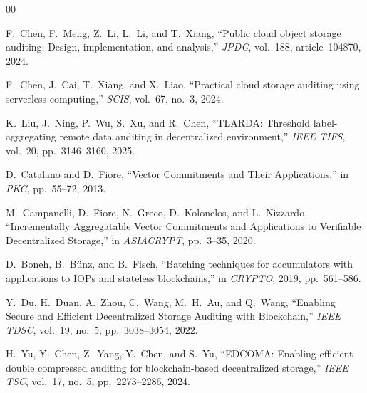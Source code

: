 \documentclass[lettersize,journal]{IEEEtran}
\begin{document}
\begin{thebibliography}{00}

F.~Chen, F.~Meng, Z.~Li, L.~Li, and T.~Xiang,
``Public cloud object storage auditing: Design, implementation, and analysis,''
\emph{JPDC}, vol.~188, article~104870, 2024.

F.~Chen, J.~Cai, T.~Xiang, and X.~Liao,
``Practical cloud storage auditing using serverless computing,''
\emph{SCIS}, vol.~67, no.~3, 2024.

K.~Liu, J.~Ning, P.~Wu, S.~Xu, and R.~Chen,
``TLARDA: Threshold label-aggregating remote data auditing in decentralized environment,''
\emph{IEEE TIFS}, vol.~20, pp.~3146--3160, 2025.

D.~Catalano and D.~Fiore,
``Vector Commitments and Their Applications,''
in \emph{PKC}, pp.~55--72, 2013.

M.~Campanelli, D.~Fiore, N.~Greco, D.~Kolonelos, and L.~Nizzardo,
``Incrementally Aggregatable Vector Commitments and Applications to Verifiable Decentralized Storage,''
in \emph{ASIACRYPT}, pp.~3--35, 2020.

D.~Boneh, B.~B{\"u}nz, and B.~Fisch,
``Batching techniques for accumulators with applications to IOPs and stateless blockchains,''
in \emph{CRYPTO}, 2019, pp.~561--586.

Y.~Du, H.~Duan, A.~Zhou, C.~Wang, M.~H.~Au, and Q.~Wang,
``Enabling Secure and Efficient Decentralized Storage Auditing with Blockchain,''
\emph{IEEE TDSC}, vol.~19, no.~5, pp.~3038--3054, 2022.


H.~Yu, Y.~Chen, Z.~Yang, Y.~Chen, and S.~Yu,
``EDCOMA: Enabling efficient double compressed auditing for blockchain-based decentralized storage,''
\emph{IEEE TSC}, vol.~17, no.~5, pp.~2273--2286, 2024.

\end{thebibliography}
\end{document}
